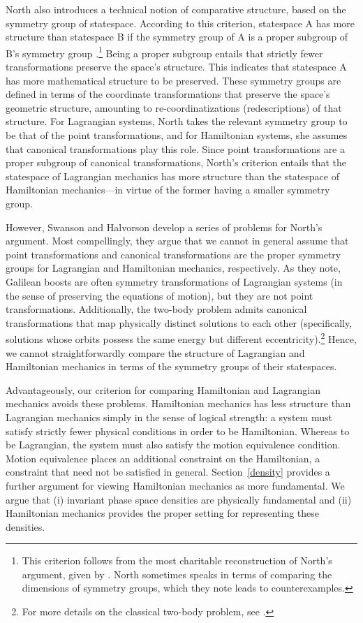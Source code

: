 \documentclass[12pt, english, twoside]{article} %
\begin{document}
North also introduces a technical notion of comparative structure, based on the symmetry group of statespace. According to this criterion, statespace A has more structure than statespace B if the symmetry group of A is a proper subgroup of B's symmetry group \parencites[87-88]{North}.\footnote{This criterion follows from the most charitable reconstruction of North's argument, given by \textcites[]{Swanson}. North sometimes speaks in terms of comparing the dimensions of symmetry groups, which they note leads to counterexamples.} Being a proper subgroup entails that strictly fewer transformations preserve the space's structure. This indicates that statespace A has more mathematical structure to be preserved. These symmetry groups are defined in terms of the coordinate transformations that preserve the space's geometric structure, amounting to re-coordinatizations (redescriptions) of that structure. For Lagrangian systems, North takes the relevant symmetry group to be that of the point transformations, and for Hamiltonian systems, she assumes that canonical transformations play this role. Since point transformations are a proper subgroup of canonical transformations, North's criterion entails that the statespace of Lagrangian mechanics has more structure than the statespace of Hamiltonian mechanics---in virtue of the former having a smaller symmetry group. 

However, Swanson and Halvorson \parencites*[]{Swanson} develop a series of problems for North's argument. Most compellingly, they argue that we cannot in general assume that point transformations and canonical transformations are the proper symmetry groups for Lagrangian and Hamiltonian mechanics, respectively. As they note, Galilean boosts are often symmetry transformations of Lagrangian systems (in the sense of preserving the equations of motion), but they are not point transformations. Additionally, the two-body problem admits canonical transformations that map physically distinct solutions to each other (specifically, solutions whose orbits possess the same energy but different eccentricity).\footnote{For more details on the classical two-body problem, see \textcites[]{Belot}.} Hence, we cannot straightforwardly compare the structure of Lagrangian and Hamiltonian mechanics in terms of the symmetry groups of their statespaces. 

Advantageously, our criterion for comparing Hamiltonian and Lagrangian mechanics avoids these problems. Hamiltonian mechanics has less structure than Lagrangian mechanics simply in the sense of logical strength: a system must satisfy strictly fewer physical conditions in order to be Hamiltonian. Whereas to be Lagrangian, the system must also satisfy the motion equivalence condition. Motion equivalence places an additional constraint on the Hamiltonian, a constraint that need not be satisfied in general. Section~\ref{density} provides a further argument for viewing Hamiltonian mechanics as more fundamental. We argue that (i) invariant phase space densities are physically fundamental and (ii) Hamiltonian mechanics provides the proper setting for representing these densities.
\end{document}
